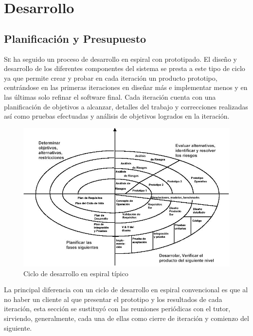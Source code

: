 \chapter{Desarrollo}
\label{chap:desarrollo}
\vspace{0.5cm}


\section{Planificación y Presupuesto}
\lettrine{S}e ha seguido un proceso de desarrollo en espiral con prototipado. El diseño y desarrollo de los diferentes componentes del sistema se presta a este tipo de ciclo ya que permite crear y probar en cada iteración un producto prototipo, centrándose en las primeras iteraciones en diseñar más e implementar menos y en las últimas solo refinar el software final. Cada iteración cuenta con una planificación de objetivos a alcanzar, detalles del trabajo y correcciones realizadas así como pruebas efectuadas y análisis de objetivos logrados en la iteración.


\begin{figure}
	\centering
	\includegraphics[width=0.8\linewidth]{imagenes/espiral.jpg}
	\caption{Ciclo de desarrollo en espiral típico}
	\label{fig:ciclo_espiral}
\end{figure}

La principal diferencia con un ciclo de desarrollo en espiral convencional es que al no haber un cliente al que presentar el prototipo y los resultados de cada iteración, esta sección se sustituyó con las reuniones periódicas con el tutor, sirviendo, generalmente, cada una de ellas como cierre de iteración y comienzo del siguiente.

